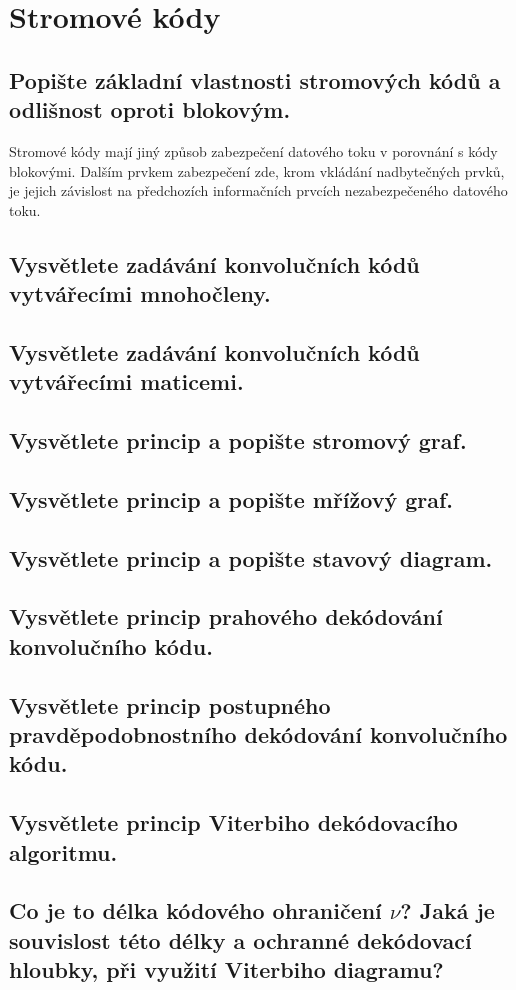 \clearpage
\section{Stromové kódy}
\subsection{Popište základní vlastnosti stromových kódů a odlišnost oproti blokovým.}
Stromové kódy mají jiný způsob zabezpečení datového toku v porovnání s kódy blokovými. Dalším prvkem zabezpečení zde, krom vkládání nadbytečných prvků, je jejich závislost na předchozích informačních prvcích nezabezpečeného datového toku.

\subsection{Vysvětlete zadávání konvolučních kódů vytvářecími mnohočleny.}

\subsection{Vysvětlete zadávání konvolučních kódů vytvářecími maticemi.}

\subsection{Vysvětlete princip a popište stromový graf.}

\subsection{Vysvětlete princip a popište mřížový graf.}

\subsection{Vysvětlete princip a popište stavový diagram.}

\subsection{Vysvětlete princip prahového dekódování konvolučního kódu.}

\subsection{Vysvětlete princip postupného pravděpodobnostního dekódování konvolučního kódu.}

\subsection{Vysvětlete princip Viterbiho dekódovacího algoritmu.}

\subsection{Co je to délka kódového ohraničení $\nu$? Jaká je souvislost této délky a ochranné
dekódovací hloubky, při využití Viterbiho diagramu?}